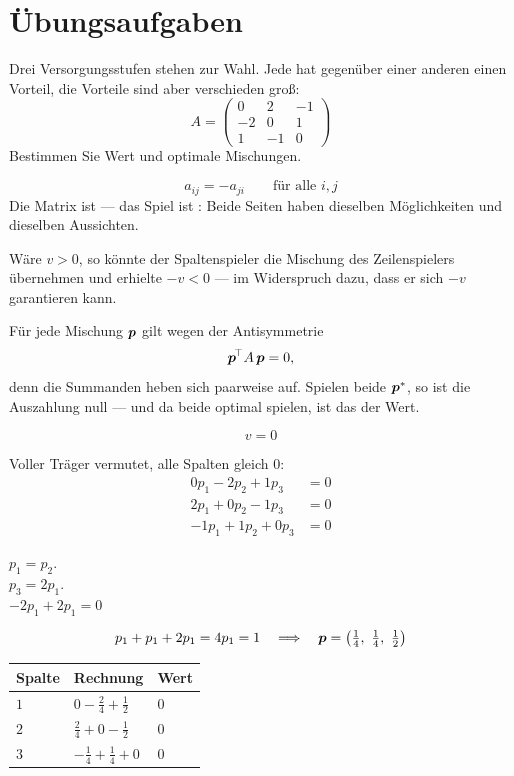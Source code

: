 \section{Übungsaufgaben}

\begin{aufgabe}
Drei Versorgungsstufen stehen zur Wahl. Jede hat gegenüber einer anderen einen Vorteil, die Vorteile sind aber verschieden groß:
\[ A = \begin{pmatrix} 0 & 2 & -1\\ -2 & 0 & 1\\ 1 & -1 & 0 \end{pmatrix} \]
Bestimmen Sie Wert und optimale Mischungen.

\loesung
{}
\[ a_{ij} = -a_{ji} \qquad\text{für alle } i,j \]
Die Matrix ist  --- das Spiel ist : Beide Seiten haben dieselben Möglichkeiten und dieselben Aussichten.

Wäre $v > 0$, so könnte der Spaltenspieler die Mischung des Zeilenspielers übernehmen und erhielte $-v < 0$ --- im Widerspruch dazu, dass er sich $-v$ garantieren kann.

 Für jede Mischung $\boldsymbol{p}$ gilt wegen der Antisymmetrie
\[ \boldsymbol{p}^{\!\top} A\,\boldsymbol{p} = 0 , \]
denn die Summanden heben sich paarweise auf. Spielen beide $\boldsymbol{p}^{*}$, so ist die Auszahlung null --- und da beide optimal spielen, ist das der Wert.

\[ v = 0 \]

Voller Träger vermutet, alle Spalten gleich $0$:
\begin{align*}
0p_1 - 2p_2 + 1p_3 &= 0\\
2p_1 + 0p_2 - 1p_3 &= 0\\
-1p_1 + 1p_2 + 0p_3 &= 0
\end{align*}

 $p_1 = p_2$.\\
 $p_3 = 2p_1$.\\
 $-2p_1 + 2p_1 = 0$ \checkmark

\[ p_1+p_1+2p_1 = 4p_1 = 1 \quad\Longrightarrow\quad \vek p = \left(\tfrac14,\ \tfrac14,\ \tfrac12\right) \]

\begin{center}
\renewcommand{\arraystretch}{1.48}
\begin{tabular}{@{}P{2.0cm}P{4.4cm}P{1.4cm}@{}}
\toprule
\textbf{Spalte} & \textbf{Rechnung} & \textbf{Wert}\\
\midrule
$1$ & $0 - \tfrac24 + \tfrac12$ & $0$\\
$2$ & $\tfrac24 + 0 - \tfrac12$ & $0$\\
$3$ & $-\tfrac14 + \tfrac14 + 0$ & $0$\\
\bottomrule
\end{tabular}
\end{center}
\checkmark


\end{aufgabe}

